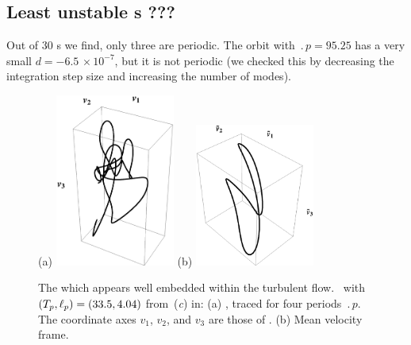 %


\subsection*{Least unstable \rpo s ???}

%
Out of 30 \rpo s we
find,  only three are periodic.  The orbit
with $\period{p} = 95.25$ has a very small
$d = -6.5\,\times 10^{-7}$, but it is not periodic
(we
checked this by decreasing the integration step size and increasing the
number of modes).


\begin{figure}[t] \label{f:rpo55}
\begin{center}
(a) \includegraphics[width=0.35\textwidth]{figs/ks22rpo033.50_04.045E2.eps}
(b) \includegraphics[width=0.35\textwidth]{figs/ks22rpo033.50_04.045E2CM.eps}
\\
\end{center}
\caption{
 The
which appears well embedded within the turbulent flow. 
\rpo\ with $({T_{p}},\ell_p) =(33.5,4.04)$
from \,(\textit{c}) in:
 (a) \Statesp, traced for four periods $\period{p}$. The coordinate axes
$v_1$, $v_2$, and $v_3$ are those of .
 (b) Mean velocity frame.
        }
\end{figure}



